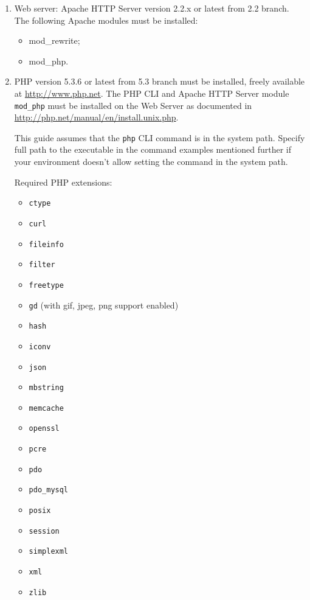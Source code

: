 \documentclass[12pt]{article}
\begin{document}
\begin{enumerate}

\item 
Web server: Apache HTTP Server version 2.2.x or latest from 2.2 branch. The following Apache modules must be installed:
\begin{itemize}
	\item mod\_rewrite;
	\item mod\_php.
\end{itemize}

\item 
PHP version 5.3.6 or latest from 5.3 branch must be installed, freely available at \url{http://www.php.net}. The PHP CLI and Apache HTTP Server module \texttt{mod\_php} must be installed on the Web Server as documented in \url{http://php.net/manual/en/install.unix.php}.

This guide assumes that the \texttt{php} CLI command is in the system path. Specify full path to the executable in the command examples mentioned further if your environment doesn't allow setting the command in the system path.

Required PHP extensions:

\begin{itemize}
\item  \texttt{ctype}
\item  \texttt{curl}
\item  \texttt{fileinfo}
\item  \texttt{filter}
\item  \texttt{freetype}
\item  \texttt{gd} (with gif, jpeg, png support enabled)
\item  \texttt{hash}
\item  \texttt{iconv}
\item  \texttt{json}
\item  \texttt{mbstring}
\item  \texttt{memcache}
\item  \texttt{openssl}
\item  \texttt{pcre}
\item  \texttt{pdo}
\item  \texttt{pdo\_mysql}
\item  \texttt{posix}
\item  \texttt{session}
\item  \texttt{simplexml}
\item  \texttt{xml}
\item  \texttt{zlib}
\end{itemize}


\end{enumerate}
\end{document}
